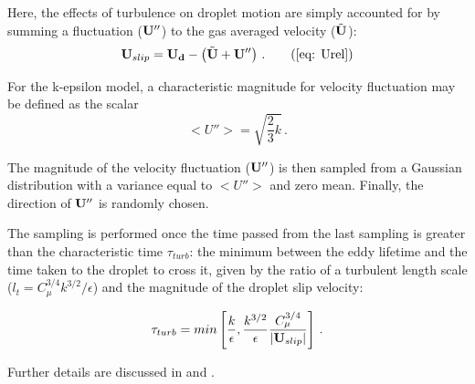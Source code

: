 Here, the effects of turbulence on droplet motion are simply accounted for by summing a fluctuation ($\mathbf{U}''$) to the gas averaged velocity ($\tilde{\mathbf{U}}$):
\begin{equation}
  \bv{U}_{slip} = \bv{U_d} - \left( \tilde{\bv{U}}+\bv{U}'' \right) \, . \tag{\ref{eq: Urel}}
\end{equation}

For the k-epsilon model, a characteristic magnitude for velocity fluctuation may be defined as the scalar
\begin{equation}
 <U''>= \sqrt{\frac{2}{3} k} \, .
\end{equation}

The magnitude of the velocity fluctuation ($\mathbf{U}''$) is then sampled from a Gaussian distribution with a variance equal to $<U''>$ and zero mean. Finally, the direction of $\mathbf{U}''$  is randomly chosen.

The sampling is performed once the time passed from the last sampling is greater than the characteristic time $\tau_{turb}$: the minimum between the eddy lifetime and the time taken to the droplet to cross it, given by the ratio of a turbulent length scale ($l_t = C_{\mu}^{3/4} k^{3/2} / \epsilon $) and the magnitude of the droplet slip velocity:

\begin{equation}
 \tau_{turb} = min \left[ \frac{k}{\epsilon} , \frac{k^{3/2}}{\epsilon} \frac{C_{\mu}^{3/4}}{|\mathbf{U}_{slip}|}\right] \, .
\end{equation}

Further details are discussed in \cite{kiva} and \cite{baumgarten2006mixture}.
